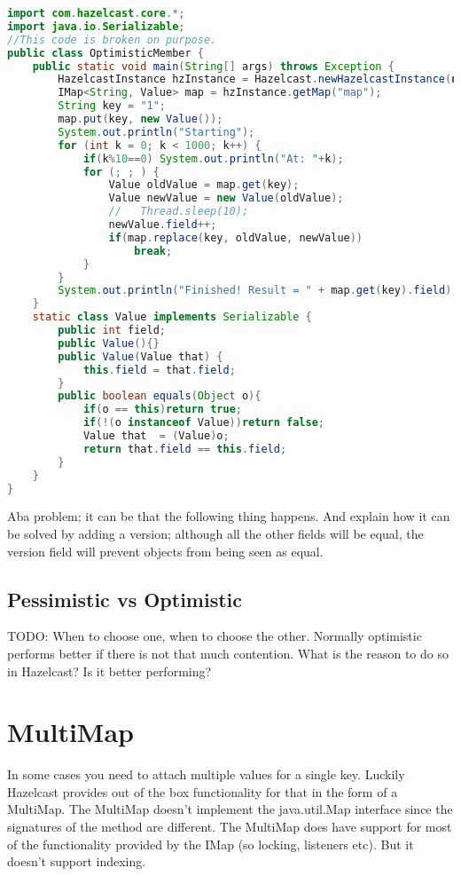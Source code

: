 \begin{lstlisting}[language=java]
import com.hazelcast.core.*;
import java.io.Serializable;
//This code is broken on purpose.
public class OptimisticMember {
    public static void main(String[] args) throws Exception {
        HazelcastInstance hzInstance = Hazelcast.newHazelcastInstance(null);
        IMap<String, Value> map = hzInstance.getMap("map");
        String key = "1";
        map.put(key, new Value());
        System.out.println("Starting");
        for (int k = 0; k < 1000; k++) {
            if(k%10==0) System.out.println("At: "+k);
            for (; ; ) {
                Value oldValue = map.get(key);
                Value newValue = new Value(oldValue);
                //   Thread.sleep(10);
                newValue.field++;
                if(map.replace(key, oldValue, newValue))
                    break;
            }
        }
        System.out.println("Finished! Result = " + map.get(key).field);
    }
    static class Value implements Serializable {
        public int field;
        public Value(){}
        public Value(Value that) {
            this.field = that.field;
        }
        public boolean equals(Object o){
            if(o == this)return true;
            if(!(o instanceof Value))return false;
            Value that  = (Value)o;
            return that.field == this.field;
        }
    }
}
\end{lstlisting}
Aba problem; it can be that the following thing happens. And explain how it can be solved by adding a version; although all the other fields will be equal, the version field will prevent objects from being seen as equal.

\subsection{Pessimistic vs Optimistic}
TODO: When to choose one, when to choose the other. Normally optimistic performs better if there is not that much contention. What is the reason to do so in Hazelcast? Is it better performing?

\section{MultiMap}
In some cases you need to attach multiple values for a single key. Luckily Hazelcast provides out of the box functionality for that in the form of a MultiMap. The MultiMap doesn't implement the java.util.Map interface since the signatures of the method are different. The MultiMap does have support for most of the functionality provided by the IMap (so locking, listeners etc). But it doesn't support indexing.

